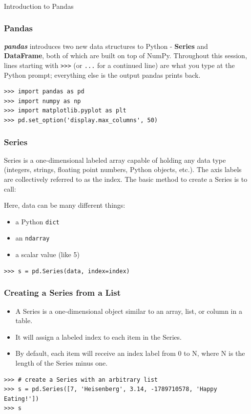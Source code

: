 \begin{frame}
  \begin{center}
    {\Large Introduction to Pandas}
  \end{center}
\end{frame}

\begin{frame}[fragile]\frametitle{Pandas}
\textbf{\textit{pandas}} introduces two new data structures to Python - \textbf{Series} and \textbf{DataFrame}, both of which are built on top of NumPy. Throughout this session, lines starting with \texttt{\textgreater\textgreater\textgreater} (or \texttt{...} for a continued line) are what you type at the Python prompt; everything else is the output pandas prints back.
\begin{lstlisting}
>>> import pandas as pd
>>> import numpy as np
>>> import matplotlib.pyplot as plt
>>> pd.set_option('display.max_columns', 50)
\end{lstlisting}
\end{frame}

\begin{frame}[fragile]\frametitle{Series}
Series is a one-dimensional labeled array capable of holding any data type (integers, strings, floating point numbers, Python objects, etc.). The axis labels are collectively referred to as the index. The basic method to create a Series is to call:

 Here, data can be many different things:
\begin{itemize}
\item a Python \texttt{dict}
\item an \texttt{ndarray}
\item a scalar value (like 5)
\end{itemize}

\begin{lstlisting}
>>> s = pd.Series(data, index=index)
\end{lstlisting}
\end{frame}

\begin{frame}[fragile]\frametitle{Creating a Series from a List}
\begin{itemize}
\item A Series is a one-dimensional object similar to an array, list, or column in a table.
\item It will assign a labeled index to each item in the Series. \item By default, each item will receive an index label from 0 to N, where N is the length of the Series minus one.
\end{itemize}
\begin{lstlisting}
>>> # create a Series with an arbitrary list
>>> s = pd.Series([7, 'Heisenberg', 3.14, -1789710578, 'Happy Eating!'])
>>> s
\end{lstlisting}
\end{frame}


